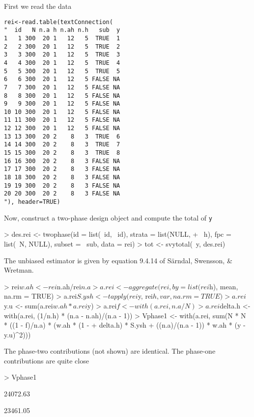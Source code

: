 \documentclass{article}
\begin{document}
First we read the data
\begin{verbatim}
rei<-read.table(textConnection(
"  id   N n.a h n.ah n.h   sub  y
1   1 300  20 1   12   5  TRUE  1
2   2 300  20 1   12   5  TRUE  2
3   3 300  20 1   12   5  TRUE  3
4   4 300  20 1   12   5  TRUE  4
5   5 300  20 1   12   5  TRUE  5
6   6 300  20 1   12   5 FALSE NA
7   7 300  20 1   12   5 FALSE NA
8   8 300  20 1   12   5 FALSE NA
9   9 300  20 1   12   5 FALSE NA
10 10 300  20 1   12   5 FALSE NA
11 11 300  20 1   12   5 FALSE NA
12 12 300  20 1   12   5 FALSE NA
13 13 300  20 2    8   3  TRUE  6
14 14 300  20 2    8   3  TRUE  7
15 15 300  20 2    8   3  TRUE  8
16 16 300  20 2    8   3 FALSE NA
17 17 300  20 2    8   3 FALSE NA
18 18 300  20 2    8   3 FALSE NA
19 19 300  20 2    8   3 FALSE NA
20 20 300  20 2    8   3 FALSE NA
"), header=TRUE)
\end{verbatim}

Now, construct a two-phase design object and compute the total of \verb=y=
\begin{Schunk}
\begin{Sinput}
> des.rei <- twophase(id = list(~id, ~id), strata = list(NULL, 
+     ~h), fpc = list(~N, NULL), subset = ~sub, data = rei)
> tot <- svytotal(~y, des.rei)
\end{Sinput}
\end{Schunk}

The unbiased estimator is given by equation 9.4.14 of S\"arndal, Swensson, \& Wretman.
\begin{Schunk}
\begin{Sinput}
> rei$w.ah <- rei$n.ah/rei$n.a
> a.rei <- aggregate(rei, by = list(rei$h), mean, na.rm = TRUE)
> a.rei$S.ysh <- tapply(rei$y, rei$h, var, na.rm = TRUE)
> a.rei$y.u <- sum(a.rei$w.ah * a.rei$y)
> a.rei$f <- with(a.rei, n.a/N)
> a.rei$delta.h <- with(a.rei, (1/n.h) * (n.a - n.ah)/(n.a - 1))
> Vphase1 <- with(a.rei, sum(N * N * ((1 - f)/n.a) * (w.ah * (1 - 
+     delta.h) * S.ysh + ((n.a)/(n.a - 1)) * w.ah * (y - y.u)^2)))
\end{Sinput}
\end{Schunk}

The phase-two contributions (not shown) are identical. The phase-one contributions are quite close
\begin{Schunk}
\begin{Sinput}
> Vphase1
\end{Sinput}
\begin{Soutput}
[1] 24072.63
\end{Soutput}
\begin{Soutput}
         [,1]
[1,] 23461.05
\end{Soutput}
\end{Schunk}
\end{document}
